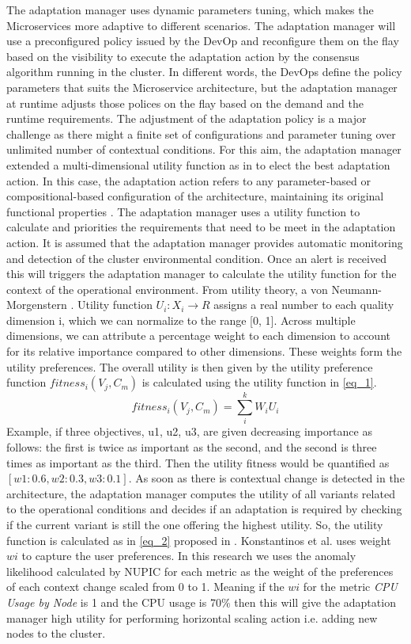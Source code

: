 \documentclass[sigconf]{acmart}
\begin{document}
The adaptation manager uses dynamic parameters tuning, which makes the Microservices more adaptive to different scenarios. The adaptation manager will use a preconfigured policy issued by the DevOp and reconfigure them on the flay based on the visibility to execute the adaptation action by the consensus algorithm running in the cluster. In different words, the DevOps define the policy parameters that suits the Microservice architecture, but the adaptation manager at runtime adjusts those polices on the flay based on the demand and the runtime requirements. The adjustment of the adaptation policy is a major challenge as there might a finite set of configurations and parameter tuning over unlimited number of contextual conditions. For this aim, the adaptation manager extended a multi-dimensional utility function as in \cite{KonstantinosKakousis:2008ub} to elect the best adaptation action. In this case, the adaptation action refers to any parameter-based or compositional-based configuration of the architecture, maintaining its original functional properties \cite{KonstantinosKakousis:2008ub}. The adaptation manager uses a utility function to calculate and priorities the requirements that need to be meet in the adaptation action. It is assumed that the adaptation manager provides automatic monitoring and detection of the cluster environmental condition. Once an alert is received this will triggers the adaptation manager to calculate the utility function for the context of the operational environment. 
From utility theory, a von Neumann-Morgenstern \cite{fishburn1979two}. Utility function  $U_{i} : X_{i} \rightarrow {R}$ 
assigns a real number to each quality dimension i, which we can normalize to the range [0, 1]. Across multiple dimensions, we can attribute a percentage weight to each dimension to account for its relative importance compared to other dimensions. These weights form the utility preferences. The overall utility is then given by the utility preference function $ fitness_{i}(V_{j},C_{m}) $ is calculated using the utility function in \ref{eq_1}. 
\begin{equation}
\label{eq_1}
fitness_{i}(V_{j},C_{m}) = \sum_{i}^{k} W_{i} U_{i}
\end{equation}
Example, if three objectives, u1, u2, u3, are given decreasing importance as follows: the first is twice as important as the second, and the second is three times as important as the third. Then the utility fitness would be quantified as $[w1 : 0.6, w2 : 0.3, w3 : 0.1]$. 
As soon as there is contextual change is detected in the architecture, the adaptation manager computes the utility of all variants related to the operational conditions and decides if an adaptation is required by checking if the current variant is still the one offering the highest utility. So, the utility function is calculated as in \ref{eq_2} proposed in \cite{KonstantinosKakousis:2008ub}. Konstantinos et al. uses weight $wi$ to capture the user preferences. In this research we uses the anomaly likelihood calculated by NUPIC for each metric as the weight of the preferences of each context change scaled from 0 to 1. Meaning if the $wi$ for the metric \textit{CPU Usage by Node} is 1 and the CPU usage is 70\% then this will give the adaptation manager high utility for performing horizontal scaling action i.e. adding new nodes to the cluster. 
\end{document}
